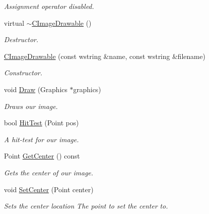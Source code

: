 \begin{DoxyCompactItemize}
\begin{DoxyCompactList}\small\item\em Assignment operator disabled. \end{DoxyCompactList}\item 
virtual \hyperlink{class_c_image_drawable_a4ecb6e494ba125a2d503bfff1260c2fe}{$\sim$\+C\+Image\+Drawable} ()
\begin{DoxyCompactList}\small\item\em Destructor. \end{DoxyCompactList}\item 
\hyperlink{class_c_image_drawable_a69a49fde766e126ad7b04aa2b6231d5e}{C\+Image\+Drawable} (const wstring \&name, const wstring \&filename)
\begin{DoxyCompactList}\small\item\em Constructor. \end{DoxyCompactList}\item 
void \hyperlink{class_c_image_drawable_a802c0e4223c536bf86f882ed75db1394}{Draw} (Graphics $\ast$graphics)
\begin{DoxyCompactList}\small\item\em Draws our image. \end{DoxyCompactList}\item 
bool \hyperlink{class_c_image_drawable_ae3093502b7858e397ee98b6366995356}{Hit\+Test} (Point pos)
\begin{DoxyCompactList}\small\item\em A hit-\/test for our image. \end{DoxyCompactList}\item 
Point \hyperlink{class_c_image_drawable_ab50ceb11d0002f4f8ffe5083006d317b}{Get\+Center} () const 
\begin{DoxyCompactList}\small\item\em Gets the center of our image. \end{DoxyCompactList}\item 
\hypertarget{class_c_image_drawable_a8de5ad7b65c518835989c7fe8b45af3d}{void \hyperlink{class_c_image_drawable_a8de5ad7b65c518835989c7fe8b45af3d}{Set\+Center} (Point center)}\label{class_c_image_drawable_a8de5ad7b65c518835989c7fe8b45af3d}

\begin{DoxyCompactList}\small\item\em Sets the center location  The point to set the center to. \end{DoxyCompactList}\end{DoxyCompactItemize}
